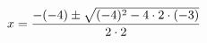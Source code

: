 \documentclass[preview]{standalone}
\begin{document}
\begin{align*}
x = {-( -4 ) \pm \sqrt{ ( -4 ) ^2 - 4 \cdot 2 \cdot ( -3 )} \over 2 \cdot 2}
\end{align*}
\end{document}
